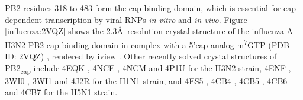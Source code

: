PB2 residues 318 to 483 form the cap-binding domain, which is essential for cap-dependent transcription by viral RNPs \textit{in vitro} and \textit{in vivo}. Figure \ref{influenza:2VQZ} shows the 2.3\AA\ resolution crystal structure of the influenza A H3N2 PB2 cap-binding domain in complex with a 5'cap analog m\textsuperscript{7}GTP (PDB ID: 2VQZ) \citep{1192}, rendered by iview \citep{1366}. Other recently solved crystal structures of PB2\textsubscript{cap} include 4EQK \citep{1554}, 4NCE \citep{1558}, 4NCM \citep{1558} and 4P1U \citep{1558} for the H3N2 strain, 4ENF \citep{1554}, 3WI0 \citep{1546}, 3WI1 \citep{1546} and 4J2R \citep{1555} for the H1N1 strain, and 4ES5 \citep{1554}, 4CB4 \citep{1557}, 4CB5 \citep{1557}, 4CB6 \citep{1557} and 4CB7 \citep{1557} for the H5N1 strain.


